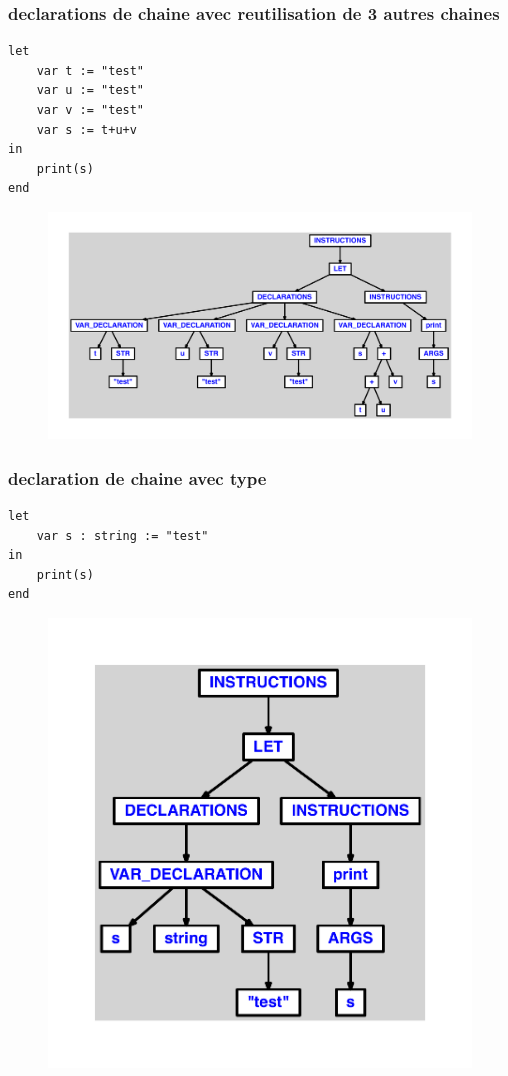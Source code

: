 \documentclass{article}
\begin{document}
\subsubsection{declarations de chaine avec reutilisation de 3 autres chaines}
\begin{lstlisting}
let
	var t := "test"
	var u := "test"
	var v := "test"
	var s := t+u+v
in
	print(s)
end
\end{lstlisting}
\newpage
\begin{figure}[H]
\centering
\includegraphics[max width=\textwidth]{ast/ast_311.pdf}
\end{figure}
\newpage
\subsubsection{declaration de chaine avec type}
\begin{lstlisting}
let
	var s : string := "test"
in
	print(s)
end
\end{lstlisting}
\newpage
\begin{figure}[H]
\centering
\includegraphics[max width=\textwidth]{ast/ast_312.pdf}
\end{figure}
\newpage
\end{document}
